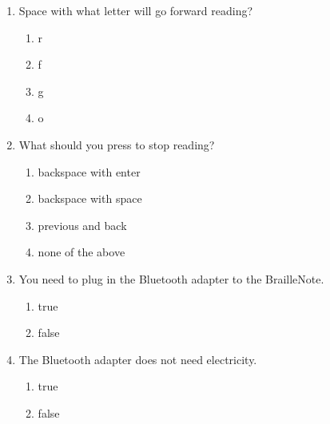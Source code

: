 \documentclass[10pt,letterpaper,twoside]{report}
\begin{document}
{{{{\begin{enumerate}
\begin{enumerate}
		      \item o with space, g
		            
		            
	      \end{enumerate}
	\item Space with what letter will go forward reading?
	      
	      \begin{enumerate}
		      \item r
		            
		      \item f
		            
		      \item g
		            
		      \item o
		            
		            
	      \end{enumerate}
	\item What should you press to stop reading?
	      
	      \begin{enumerate}
		      \item backspace with enter
		            
		      \item backspace with space
		            
		      \item previous and back
		            
		      \item none of the above
		            
		            
	      \end{enumerate}
	\item You need to plug in the Bluetooth adapter to the BrailleNote.
	      
	      \begin{enumerate}
		      \item true
		            
		      \item false
		            
		            
	      \end{enumerate}
	\item The Bluetooth adapter does not need electricity.
	      
	      \begin{enumerate}
		      \item true
		            
		      \item false
		            

\end{enumerate}
\end{enumerate}}}}}
\end{document}
